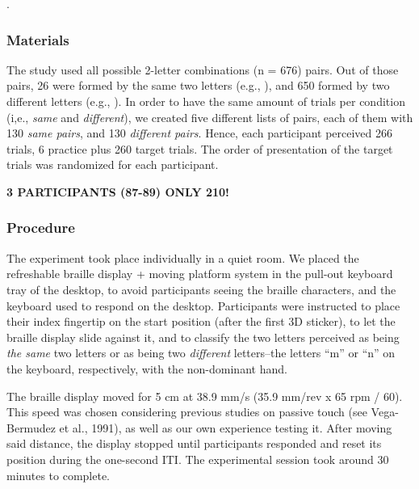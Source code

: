 \documentclass[
  english,
  man]{apa7}
\begin{document}
{\colorbox{blue}{\sffamily\scriptsize\bfseries\color{white}{abl}}}{\sffamily\small\itshape\color{blue}{maybe add something like: even though this is not the most ecological way to read, participants' performance while using this "passive-haptic" method was similar to their performance using the active exploration of the patterns (MA Thesis)}}.

\hypertarget{materials}{%
\subsubsection{Materials}\label{materials}}

The study used all possible 2-letter combinations (n = 676) pairs. Out of those pairs, 26 were formed by the same two letters (e.g.,  ), and 650 formed by two different letters (e.g.,  ). In order to have the same amount of trials per condition (i,e., \emph{same} and \emph{different}), we created five different lists of pairs, each of them with 130 \emph{same pairs}, and 130 \emph{different pairs}. Hence, each participant perceived 266 trials, 6 practice plus 260 target trials. The order of presentation of the target trials was randomized for each participant.

\textbf{3 PARTICIPANTS (87-89) ONLY 210!}

\hypertarget{procedure}{%
\subsubsection{Procedure}\label{procedure}}

The experiment took place individually in a quiet room. We placed the refreshable braille display + moving platform system in the pull-out keyboard tray of the desktop, to avoid participants seeing the braille characters, and the keyboard used to respond on the desktop. Participants were instructed to place their index fingertip on the start position (after the first 3D sticker), to let the braille display slide against it, and to classify the two letters perceived as being \emph{the same} two letters or as being two \emph{different} letters--the letters ``m'' or ``n'' on the keyboard, respectively, with the non-dominant hand.

The braille display moved for 5 cm at 38.9 mm/s (35.9 mm/rev x 65 rpm / 60). This speed was chosen considering previous studies on passive touch (see Vega-Bermudez et al., 1991), as well as our own experience testing it. After moving said distance, the display stopped until participants responded and reset its position during the one-second ITI. The experimental session took around 30 minutes to complete.
\end{document}

